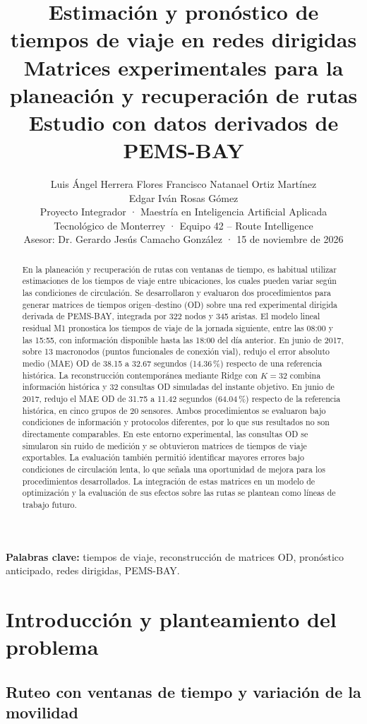 \documentclass[letterpaper,11pt]{article}
\title{\textbf{Estimación y pronóstico de tiempos de viaje en redes dirigidas}\\[4pt]
\large Matrices experimentales para la planeación y recuperación de rutas\\[3pt]
\normalsize Estudio con datos derivados de PEMS-BAY}
\author{Luis Ángel Herrera Flores \quad Francisco Natanael Ortiz Martínez\\ Edgar Iván Rosas Gómez\\[6pt]
\normalsize Proyecto Integrador · Maestría en Inteligencia Artificial Aplicada\\[3pt]
\normalsize Tecnológico de Monterrey · Equipo 42 -- Route Intelligence\\[3pt]
\normalsize Asesor: Dr. Gerardo Jesús Camacho González · 15 de noviembre de 2026}
\date{\vspace{-2ex}}
\begin{document}
\maketitle
\begin{abstract}

En la planeación y recuperación de rutas con ventanas de tiempo, es habitual utilizar estimaciones de los tiempos de viaje entre ubicaciones, los cuales pueden variar según las condiciones de circulación. Se desarrollaron y evaluaron dos procedimientos para generar matrices de tiempos origen--destino (OD) sobre una red experimental dirigida derivada de PEMS-BAY, integrada por 322 nodos y 345 aristas. El modelo lineal residual M1 pronostica los tiempos de viaje de la jornada siguiente, entre las 08:00 y las 15:55, con información disponible hasta las 18:00 del día anterior. En junio de 2017, sobre 13 macronodos (puntos funcionales de conexión vial), redujo el error absoluto medio (MAE) OD de 38.15 a 32.67 segundos (14.36\,\%) respecto de una referencia histórica. La reconstrucción contemporánea mediante Ridge con $K=32$ combina información histórica y 32 consultas OD simuladas del instante objetivo. En junio de 2017, redujo el MAE OD de 31.75 a 11.42 segundos (64.04\,\%) respecto de la referencia histórica, en cinco grupos de 20 sensores. Ambos procedimientos se evaluaron bajo condiciones de información y protocolos diferentes, por lo que sus resultados no son directamente comparables. En este entorno experimental, las consultas OD se simularon sin ruido de medición y se obtuvieron matrices de tiempos de viaje exportables. La evaluación también permitió identificar mayores errores bajo condiciones de circulación lenta, lo que señala una oportunidad de mejora para los procedimientos desarrollados. La integración de estas matrices en un modelo de optimización y la evaluación de sus efectos sobre las rutas se plantean como líneas de trabajo futuro.
\end{abstract}
\noindent\textbf{Palabras clave:} tiempos de viaje, reconstrucción de matrices OD, pronóstico anticipado, redes dirigidas, PEMS-BAY.

\section{Introducción y planteamiento del problema}
\subsection{Ruteo con ventanas de tiempo y variación de la movilidad}
\end{document}
